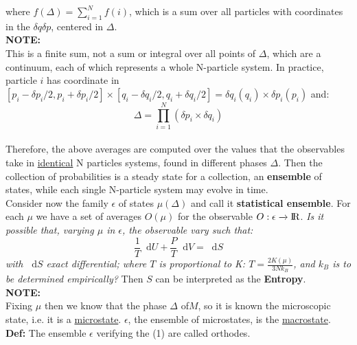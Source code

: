 \documentclass{article}
\newcommand*\diff{\mathop{}\!\mathrm{d}}
\begin{document}
where $f(\Delta) = \sum_{i=1}^N f(i)$, which is a sum over all particles with coordinates in the $\delta q \delta p$, centered in $\Delta$.\\
\newline
\textbf{NOTE:}\\
This is a finite sum, not a sum or integral over all points of $\Delta$, which are a continuum, each of which represents a whole N-particle system. In practice, particle $i$ has coordinate in $[p_i -\delta p_i/2,p_i+\delta p_i/2] \times [q_i - \delta q_i/2,q_i +\delta q_i/2]=\delta q_i(q_i) \times \delta p_i(p_i)$ and:
$$ \Delta = \prod_{i=1}^{N} (\delta p_i \times \delta q_i)  $$
\\
Therefore, the above averages are computed over the values that the observables take in \underline{identical} N particles systems, found in different phases $\Delta$. Then the collection of probabilities is a steady state for a collection, an \textbf{ensemble} of states, while each single N-particle system may evolve in time.\\
Consider now the family $\epsilon $ of states $\mu(\Delta)$ and call it \textbf{statistical ensemble}.
For each $\mu$ we have a set of averages $O(\mu)$ for the observable $O: \epsilon \xrightarrow{} \rm I\!R$.
\textit{Is it possible that, varying $\mu$ in $\epsilon$, the observable vary such that:}
\begin{equation}
   \frac{1}{T} \diff{U} +\frac{P}{T} \diff{V} = \diff{S}  
\end{equation}
\textit{with $\diff{S}$ exact differential; where $T$ is proportional to K: $T=\frac{2 K(\mu)}{3N k_B }$, and $k_B$ is to be determined empirically?}
Then $S$ can be interpreted as the \textbf{Entropy}.\\
\newline
\textbf{NOTE:}\\
Fixing $\mu$ then we know that the phase $\Delta$ of$M$, so it is known the microscopic state, i.e. it is a \underline{microstate}. $\epsilon$, the ensemble of microstates, is the \underline{macrostate}. \\
\newline
\textbf{Def:} The ensemble $\epsilon$ verifying the (1) are called orthodes. 
\end{document}
